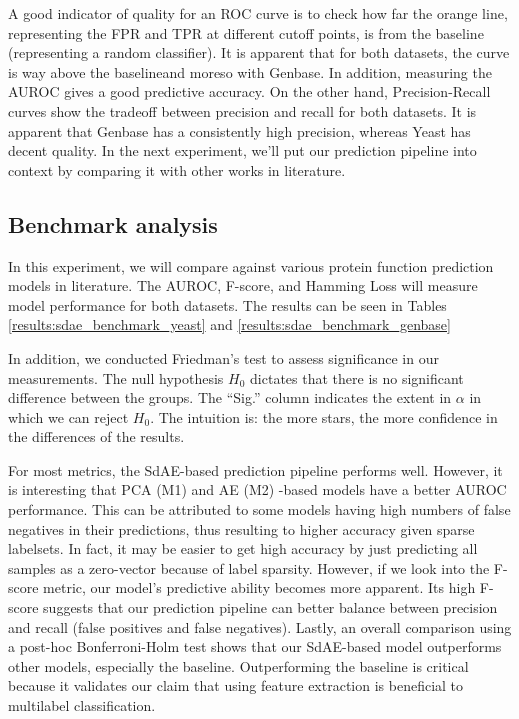 \par A good indicator of quality for an ROC curve is to check how far the
orange line, representing the FPR and TPR at different cutoff points, is from
the baseline (representing a random classifier). It is apparent that for both
datasets, the curve is way above the baseline\textemdash and moreso with
Genbase. In addition, measuring the AUROC gives a good predictive accuracy.
On the other hand, Precision-Recall curves show the tradeoff between
precision and recall for both datasets. It is apparent that Genbase has a
consistently high precision, whereas Yeast has decent quality. In the next
experiment, we'll put our prediction pipeline into context by comparing it
with other works in literature.


\subsection{Benchmark analysis}

\par In this experiment, we will compare against various protein function
prediction models in literature. The AUROC, F-score, and Hamming Loss will
measure model performance for both datasets. The results can be seen in
Tables \ref{results:sdae_benchmark_yeast} and
\ref{results:sdae_benchmark_genbase}

\par In addition, we conducted Friedman's test to assess significance in our
measurements. The null hypothesis $H_{0}$ dictates that there is no
significant difference between the groups. The ``Sig.'' column indicates the
extent in $\alpha$ in which we can reject $H_{0}$. The intuition is: the more
stars, the more confidence in the differences of the results.

\par For most metrics, the SdAE-based prediction pipeline performs well.
However, it is interesting that PCA (M1) and AE (M2) -based models have a
better AUROC performance. This can be attributed to some models having high
numbers of false negatives in their predictions, thus resulting to higher
accuracy given sparse labelsets. In fact, it may be easier to get high accuracy
by just predicting all samples as a zero-vector because of label sparsity.
However, if we look into the F-score metric, our model's predictive ability
becomes more apparent. Its high F-score suggests that our prediction pipeline
can better balance between precision and recall (false positives and false
negatives). Lastly, an overall comparison using a post-hoc Bonferroni-Holm test
shows that our SdAE-based model outperforms other models, especially the
baseline. Outperforming the baseline is critical because it validates our claim
that using feature extraction is beneficial to multilabel classification.

